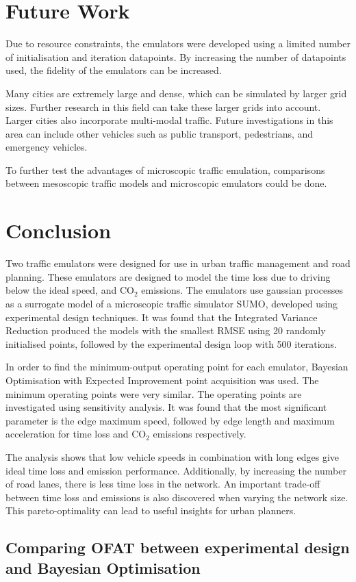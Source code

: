 \documentclass{article}
\begin{document}
\section{Future Work}

Due to resource constraints, the emulators were developed using a limited number of initialisation and iteration datapoints. By increasing the number of datapoints used, the fidelity of the emulators can be increased. 

Many cities are extremely large and dense, which can be simulated by larger grid sizes. Further research in this field can take these larger grids into account. Larger cities also incorporate multi-modal traffic. Future investigations in this area can include other vehicles such as public transport, pedestrians, and emergency vehicles. 

To further test the advantages of microscopic traffic emulation, comparisons between mesoscopic traffic models and microscopic emulators could be done.

\section{Conclusion}
\label{sec:conclusion}

Two traffic emulators were designed for use in urban traffic management and road planning. These emulators are designed to model the time loss due to driving below the ideal speed, and CO$_2$ emissions. The emulators use gaussian processes as a surrogate model of a microscopic traffic simulator SUMO, developed using experimental design techniques. It was found that the Integrated Variance Reduction produced the models with the smallest RMSE using 20 randomly initialised points, followed by the experimental design loop with 500 iterations. 

In order to find the minimum-output operating point for each emulator, Bayesian Optimisation with Expected Improvement point acquisition was used. The minimum operating points were very similar. The operating points are investigated using sensitivity analysis. It was found that the most significant parameter is the edge maximum speed, followed by edge length and maximum acceleration for time loss and CO$_2$ emissions respectively. 

The analysis shows that low vehicle speeds in combination with long edges give ideal time loss and emission performance. Additionally, by increasing the number of road lanes, there is less time loss in the network. An important trade-off between time loss and emissions is also discovered when varying the network size. This pareto-optimality can lead to useful insights for urban planners.

\newpage



\newpage
\begin{appendices}
\section{Comparing OFAT between experimental design and Bayesian Optimisation}
\label{appendix:comparison}

\end{appendices}
\end{document}
